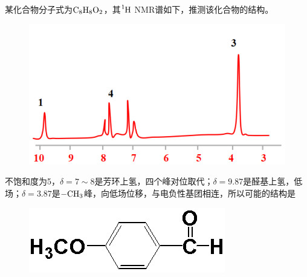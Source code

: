 \begin{example}
	某化合物分子式为$\ce{C8H8O2}$，其$\ce{^{1}H}$ NMR谱如下，推测该化合物的结构。
	
	\begin{figure}[!h]
		\centering
		\includegraphics[width=0.7\linewidth]{image/chp6_example2}
		\label{fig:chp6example2}
	\end{figure}	
	不饱和度为5，$\delta=7\sim 8$是芳环上氢，四个峰对位取代；$\delta=9.87$是醛基上氢，低场；$\delta=3.87$是$\ce{-CH3}$峰，向低场位移，与电负性基团相连，所以可能的结构是
	
	\begin{figure}[!h]
		\centering
		\includegraphics[width=0.5\linewidth]{image/chp6_answer2}
		\label{fig:chp6answer2}
	\end{figure}
\end{example}